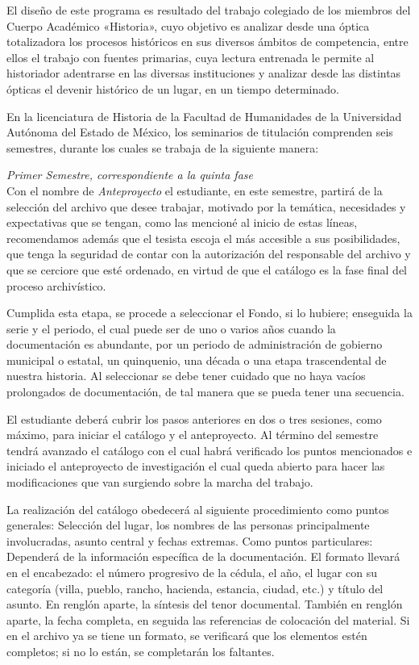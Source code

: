 \enlargethispage{1\baselineskip}

\noindent El diseño de este programa es resultado del trabajo colegiado 
de los miembros del Cuerpo Académico «Historia», cuyo objetivo es 
analizar desde una óptica totalizadora los procesos históricos en sus 
diversos ámbitos de competencia, entre ellos el trabajo con fuentes 
primarias, cuya lectura entrenada le permite al historiador adentrarse 
en las diversas instituciones y analizar desde las distintas ópticas  
el devenir histórico de un lugar, en un tiempo determinado.

En la licenciatura de Historia de la Facultad de Humanidades de la 
Universidad Autónoma del Estado de México, los seminarios de titulación 
comprenden seis semestres, durante los cuales se trabaja de la 
siguiente manera:

\noindent \textsl{Primer Semestre, correspondiente a la quinta fase}\\ 
Con el nombre de \textit{Anteproyecto} el estudiante, en este semestre, 
partirá de la selección del archivo que desee trabajar, motivado por la 
temática, necesidades y expectativas que se tengan, como las mencioné 
al inicio de estas líneas, recomendamos además que el tesista escoja el 
más accesible a sus posibilidades, que tenga la seguridad de contar con 
la autorización del responsable del archivo y que se cerciore que esté 
ordenado, en virtud de que el catálogo es la fase final del proceso 
archivístico.

Cumplida esta etapa, se procede a seleccionar el Fondo, si lo hubiere; 
enseguida la serie y el periodo, el cual puede ser de uno o varios años cuando la 
documentación es abundante,  por un periodo de 
administración de gobierno municipal o estatal, un quinquenio, una 
década o una etapa trascendental de nuestra historia. Al seleccionar se 
debe tener cuidado que no haya vacíos prolongados de documentación, de 
tal manera que se pueda tener una secuencia.

El estudiante deberá cubrir los pasos anteriores en dos o tres sesiones, 
como máximo, para iniciar el catálogo y el anteproyecto. Al término del 
semestre tendrá avanzado el catálogo con el cual habrá verificado los 
puntos mencionados e iniciado el anteproyecto de investigación el cual 
queda abierto para hacer las modificaciones que van surgiendo sobre la 
marcha del trabajo.

La realización del catálogo obedecerá  al siguiente procedimiento como 
puntos generales: Selección del lugar, los nombres de las personas 
principalmente involucradas, asunto central y fechas extremas. Como 
puntos particulares: Dependerá de la información específica de la 
documentación. El formato llevará en el encabezado: el número 
progresivo de la cédula, el año, el lugar con su categoría (villa, 
pueblo, rancho, hacienda, estancia, ciudad, etc.) y título del asunto. 
En renglón aparte, la síntesis del tenor documental. También en renglón 
aparte, la fecha completa, en seguida las referencias de colocación del 
material. Si en el  archivo ya se tiene un formato, se verificará que 
los elementos estén completos; si no lo están, se completarán los 
faltantes.

